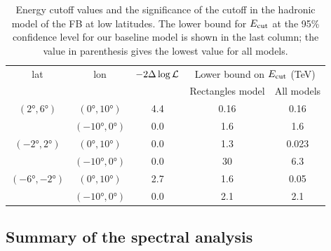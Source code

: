 \begin{table}
  \begin{center}
    \caption{Energy cutoff values and the significance of the cutoff in the hadronic model of the FB at low latitudes.
The lower bound for $E_{\text{cut}}$ at the 95\% confidence level for our baseline model is shown in the last column; the value in parenthesis gives the lowest value for all models.}
    \label{tab:pi0}
    \begin{tabular}{|c|c|c|c|c|} %
     	\hline
		 lat & lon  & $-2 \Delta \log {\mathcal{L}}$ & \multicolumn{2}{c|}{Lower bound on $E_{\text{cut}}$ (TeV) } \\
		      &        &                                  &       \multicolumn{1}{c}{Rectangles model} & All models \\ 
		\hline
  		$(\ang{2}, \ang{6})$ & $(\ang{0}, \ang{10})$ & 4.4 & 0.16  & 0.16 \\ 
		& $(\ang{-10}, \ang{0})$ &  0.0 & 1.6 & 1.6 \\ 
 		\hline
  		$(\ang{-2}, \ang{2})$ & $(\ang{0}, \ang{10})$ & 0.0 & 1.3 & 0.023 \\ 
		& $(\ang{-10}, \ang{0})$ & 0.0 & 30 & 6.3 \\ 
 		\hline
  		$(\ang{-6}, \ang{-2})$ & $(\ang{0}, \ang{10})$ & 2.7 & 1.6 & 0.05 \\ 
		& $(\ang{-10}, \ang{0})$ & 0.0 & 2.1 & 2.1 \\ 
 \hline
    \end{tabular}
  \end{center}
\end{table}


\subsection{Summary of the spectral analysis}

